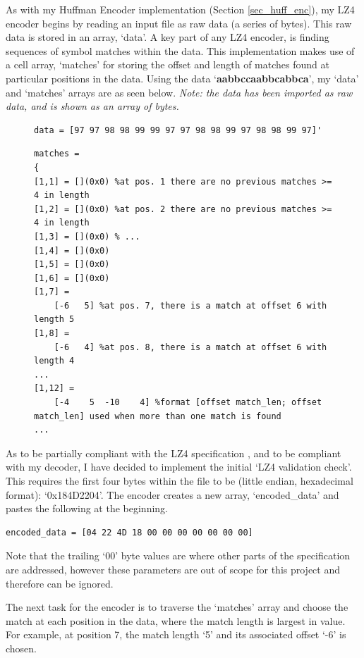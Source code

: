 \documentclass[12pt]{article}
\begin{document}
As with my Huffman Encoder implementation (Section \ref{sec_huff_enc}), my LZ4 encoder begins by reading an input file as raw data (a series of bytes). This raw data is stored in an array, `data'. A key part of any LZ4 encoder, is finding sequences of symbol matches within the data. This implementation makes use of a cell array, `matches' for storing the offset and length of matches found at particular positions in the data. Using the data `\textbf{aabbccaabbcabbca}', my `data' and `matches' arrays are as seen below. \emph{Note: the data has been imported as raw data, and is shown as an array of bytes.}

\begin{figure}[H]
\begin{verbatim}
data = [97 97 98 98 99 99 97 97 98 98 99 97 98 98 99 97]'
\end{verbatim}
\begin{verbatim}
matches =
{
[1,1] = [](0x0) %at pos. 1 there are no previous matches >= 4 in length
[1,2] = [](0x0) %at pos. 2 there are no previous matches >= 4 in length
[1,3] = [](0x0) % ...
[1,4] = [](0x0)
[1,5] = [](0x0)
[1,6] = [](0x0)
[1,7] =
	[-6   5] %at pos. 7, there is a match at offset 6 with length 5
[1,8] =
	[-6   4] %at pos. 8, there is a match at offset 6 with length 4
...
[1,12] =
	[-4    5  -10    4] %format [offset match_len; offset match_len] used when more than one match is found
...
\end{verbatim}
\end{figure}

As to be partially compliant with the LZ4 specification \citep{lz4_github}, and to be compliant with my decoder, I have decided to implement the initial `LZ4 validation check'. This requires the first four bytes within the file to be (little endian, hexadecimal format): `0x184D2204'. The encoder creates a new array, `encoded\_data' and pastes the following at the beginning.

\begin{verbatim}
encoded_data = [04 22 4D 18 00 00 00 00 00 00 00]
\end{verbatim}

Note that the trailing `00' byte values are where other parts of the specification are addressed, however these parameters are out of scope for this project and therefore can be ignored.

The next task for the encoder is to traverse the `matches' array and choose the match at each position in the data, where the match length is largest in value. For example, at position 7, the match length `5' and its associated offset `-6' is chosen.
\end{document}
